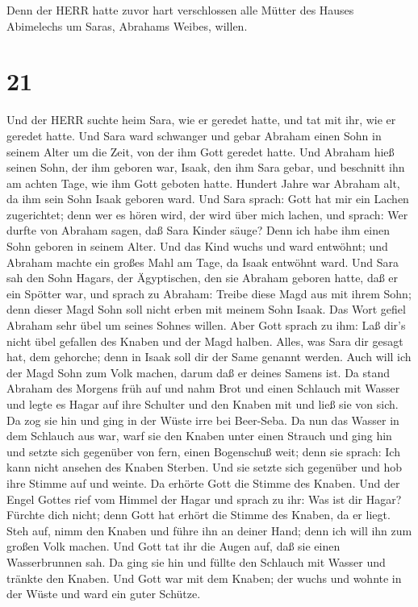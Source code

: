  Denn der HERR hatte zuvor hart verschlossen alle Mütter
des Hauses Abimelechs um Saras, Abrahams Weibes, willen.

\hypertarget{section-20}{%
\section{21}\label{section-20}}

 Und der HERR suchte heim Sara, wie er geredet hatte, und
tat mit ihr, wie er geredet hatte.  Und Sara ward schwanger
und gebar Abraham einen Sohn in seinem Alter um die Zeit, von der ihm
Gott geredet hatte.  Und Abraham hieß seinen Sohn, der ihm
geboren war, Isaak, den ihm Sara gebar,  und beschnitt ihn
am achten Tage, wie ihm Gott geboten hatte.  Hundert Jahre
war Abraham alt, da ihm sein Sohn Isaak geboren ward.  Und
Sara sprach: Gott hat mir ein Lachen zugerichtet; denn wer es hören
wird, der wird über mich lachen,  und sprach: Wer durfte von
Abraham sagen, daß Sara Kinder säuge? Denn ich habe ihm einen Sohn
geboren in seinem Alter.  Und das Kind wuchs und ward
entwöhnt; und Abraham machte ein großes Mahl am Tage, da Isaak entwöhnt
ward.  Und Sara sah den Sohn Hagars, der Ägyptischen, den
sie Abraham geboren hatte, daß er ein Spötter war,  und
sprach zu Abraham: Treibe diese Magd aus mit ihrem Sohn; denn dieser
Magd Sohn soll nicht erben mit meinem Sohn Isaak.  Das Wort
gefiel Abraham sehr übel um seines Sohnes willen.  Aber
Gott sprach zu ihm: Laß dir's nicht übel gefallen des Knaben und der
Magd halben. Alles, was Sara dir gesagt hat, dem gehorche; denn in Isaak
soll dir der Same genannt werden.  Auch will ich der Magd
Sohn zum Volk machen, darum daß er deines Samens ist.  Da
stand Abraham des Morgens früh auf und nahm Brot und einen Schlauch mit
Wasser und legte es Hagar auf ihre Schulter und den Knaben mit und ließ
sie von sich. Da zog sie hin und ging in der Wüste irre bei Beer-Seba.
 Da nun das Wasser in dem Schlauch aus war, warf sie den
Knaben unter einen Strauch  und ging hin und setzte sich
gegenüber von fern, einen Bogenschuß weit; denn sie sprach: Ich kann
nicht ansehen des Knaben Sterben. Und sie setzte sich gegenüber und hob
ihre Stimme auf und weinte.  Da erhörte Gott die Stimme des
Knaben. Und der Engel Gottes rief vom Himmel der Hagar und sprach zu
ihr: Was ist dir Hagar? Fürchte dich nicht; denn Gott hat erhört die
Stimme des Knaben, da er liegt.  Steh auf, nimm den Knaben
und führe ihn an deiner Hand; denn ich will ihn zum großen Volk machen.
 Und Gott tat ihr die Augen auf, daß sie einen
Wasserbrunnen sah. Da ging sie hin und füllte den Schlauch mit Wasser
und tränkte den Knaben.  Und Gott war mit dem Knaben; der
wuchs und wohnte in der Wüste und ward ein guter Schütze.

